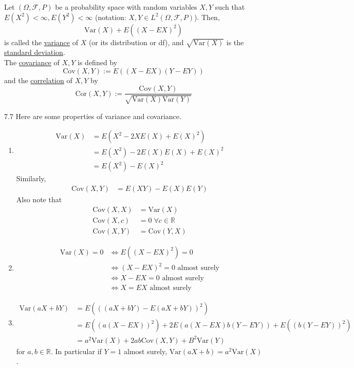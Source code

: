 \documentclass{article}
\newcommand{\R}{\mathbb{R}}
\newcommand{\Var}{\mathrm{Var}}
\newcommand{\Cov}{\mathrm{Cov}}
\newcommand{\Cor}{\text{Cor}}
\begin{document}
		\begin{mydef}{}{}
			Let $(\Omega, \mathcal{F}, P)$ be a probability space with random variables $X, Y$ such that $E(X^2)<\infty, E(Y^2)<\infty$ (notation: $X, Y\in L^2(\Omega, \mathcal{F}, P)$). Then, $$\Var(X)+E((X-EX)^2)$$ is called the \ul{variance} of $X$ (or its distribution or df), and $\sqrt{\Var(X)}$ is the \ul{standard deviation}.\\
			
			The \ul{covariance} of $X, Y$ is defined by $$\Cov(X, Y):=E((X-EX)(Y-EY))$$ and the \ul{correlation} of $X, Y$ by $$\Cor(X, Y):=\frac{\Cov(X, Y)}{\sqrt{\Var(X)\Var(Y)}}$$
		\end{mydef}
		
		\begin{myrem}{}{7.7}
			Here are some properties of variance and covariance.
			\begin{enumerate}
				\item
				\begin{align*}
					\Var(X)&=E(X^2-2XE(X)+E(X)^2)\\
					&=E(X^2)-2E(X)E(X)+E(X)^2\\
					&=E(X^2)-E(X)^2
				\end{align*}
				Similarly,
				\begin{align*}
					\Cov(X, Y)&=E(XY)-E(X)E(Y)
				\end{align*}
				Also note that
				\begin{align*}
					\Cov(X, X)&=\Var(X)\\
					\Cov(X, c)&=0\;\forall c\in\R\\
					\Cov(X, Y)&=\Cov(Y, X)
				\end{align*}
				
				\item
				\begin{align*}
					\Var(X)=0&\Leftrightarrow E((X-EX)^2)=0\\
					&\Leftrightarrow(X-EX)^2=0\mbox{ almost surely}\\
					&\Leftrightarrow X-EX=0\mbox{ almost surely}\\
					&\Leftrightarrow X=EX\mbox{ almost surely}
				\end{align*}
				
				\item
				\begin{align*}
					\Var(aX+bY)&=E(((aX+bY)-E(aX+bY))^2)\\
					&=E((a(X-EX))^2)+2E(a(X-EX)b(Y-EY))+E((b(Y-EY))^2)\\
					&=a^2\Var(X)+2ab\Cov(X, Y)+B^2\Var(Y)
				\end{align*}
				for $a, b\in\R$. In particular if $Y=1$ almost surely, $\Var(aX+b)=a^2\Var(X)$.
				

\end{enumerate}
\end{myrem}
\end{document}
